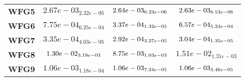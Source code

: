 \documentclass{article}
\begin{document}
\begin{table}[!htp]
\begin{scriptsize}
\begin{tabular}{c|ccc}
      \textbf{WFG5} & $2.67e-03_{2.32e-05} $ & $ \cellcolor{gray25} 2.64e-03_{6.23e-06} $ & $ \cellcolor{gray95} 2.63e-03_{8.53e-06}$ \\
      \textbf{WFG6} & $7.75e-04_{6.25e-04} $ & $ \cellcolor{gray95} 3.37e-04_{1.32e-05} $ & $ \cellcolor{gray25} 6.57e-04_{5.24e-04}$ \\
      \textbf{WFG7} & $3.35e-04_{4.03e-05} $ & $ \cellcolor{gray95} 2.92e-04_{3.27e-05} $ & $ \cellcolor{gray25} 3.04e-04_{1.35e-05}$ \\
      \textbf{WFG8} & $\cellcolor{gray25} 1.30e-02_{3.19e-03} $ & $ \cellcolor{gray95} 8.75e-03_{1.03e-03} $ & $ 1.51e-02_{1.31e-03}$ \\
      \textbf{WFG9} & $1.06e-03_{1.18e-04} $ & $ \cellcolor{gray25} 1.06e-03_{7.24e-05} $ & $ \cellcolor{gray95} 1.06e-03_{3.46e-05}$ \\
  \end{tabular}
  \end{scriptsize}
\end{table}
\end{document}
